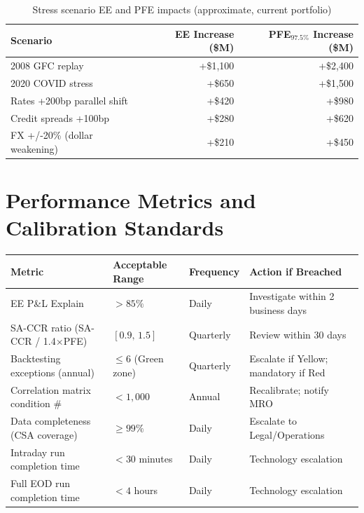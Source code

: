 \documentclass[11pt,a4paper]{article}
\begin{document}
\begin{table}[h!]
\centering
\begin{tabular}{@{}lrr@{}}
\toprule
\textbf{Scenario} & \textbf{EE Increase (\$M)} & \textbf{PFE$_{97.5\%}$ Increase (\$M)} \\
\midrule
2008 GFC replay              & +\$1{,}100 & +\$2{,}400 \\
2020 COVID stress            & +\$650     & +\$1{,}500 \\
Rates +200bp parallel shift  & +\$420     & +\$980 \\
Credit spreads +100bp        & +\$280     & +\$620 \\
FX +/-20\% (dollar weakening) & +\$210     & +\$450 \\
\bottomrule
\end{tabular}
\caption{Stress scenario EE and PFE impacts (approximate, current portfolio)}
\end{table}

\section{Performance Metrics and Calibration Standards}

\begin{longtable}{@{}llll@{}}
\toprule
\textbf{Metric} & \textbf{Acceptable Range} & \textbf{Frequency} & \textbf{Action if Breached} \\
\midrule
\endhead
\bottomrule
\endfoot
EE P\&L Explain                & $>85\%$           & Daily    & Investigate within 2 business days \\
SA-CCR ratio (SA-CCR / 1.4$\times$PFE) & $[0.9,\, 1.5]$  & Quarterly & Review within 30 days \\
Backtesting exceptions (annual) & $\leq 6$ (Green zone) & Quarterly & Escalate if Yellow; mandatory if Red \\
Correlation matrix condition \# & $<1{,}000$        & Annual   & Recalibrate; notify MRO \\
Data completeness (CSA coverage) & $\geq 99\%$       & Daily    & Escalate to Legal/Operations \\
Intraday run completion time    & $<30$ minutes      & Daily    & Technology escalation \\
Full EOD run completion time    & $<4$ hours         & Daily    & Technology escalation \\
\end{longtable}
\end{document}
